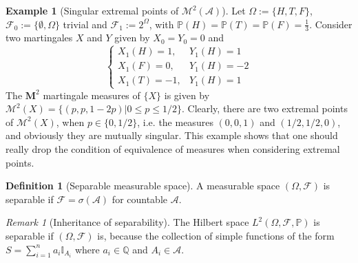 \documentclass[openany,oneside]{book}
\theoremstyle{definition}
\newtheorem{defn}[thm]{Definition}
\newtheorem{eg}[thm]{Example}
\theoremstyle{remark}
\newtheorem{rem}[thm]{Remark}
\renewcommand{\P}{\mathbb{P}} %
\newcommand{\I}{\mathbb{I}} %
\begin{document}


\begin{eg}[Singular extremal points of $\mathcal{M}^2(\mathcal{A})$]
Let $\Omega:=\{H,T,F\}$, $\mathcal{F}_0:=\{\emptyset,\Omega\}$ trivial and $\mathcal{F}_1:=2^\Omega$, with $\P(H)=\P(T)=\P(F)=\frac{1}{3}$. Consider two martingales $X$ and $Y$ given by $X_0=Y_0=0$ and
$$\begin{cases}
X_1(H) = 1, & Y_1(H) = 1 \\
X_1(F) = 0, & Y_1(H) = -2 \\
X_1(T) = -1, & Y_1(H) = 1
\end{cases}$$
The $\mathbf{M}^2$ martingale measures of $\{X\}$ is given by $\mathcal{M}^2(X)=\{(p,p,1-2p) \big\vert 0\le p \le 1/2\}$. Clearly, there are two extremal points of $\mathcal{M}^2(X)$, when $p\in\{0,1/2\}$, i.e. the measures $(0,0,1)$ and $(1/2,1/2,0)$, and obviously they are mutually singular. This example shows that one should really drop the condition of equivalence of measures when considering extremal points.
\end{eg}


\begin{defn}[Separable measurable space]
A measurable space $(\Omega,\mathcal{F})$ is separable if $\mathcal{F}=\sigma(\mathcal{A})$ for countable $\mathcal{A}$.
\end{defn}
\begin{rem}[Inheritance of separability]
The Hilbert space $L^2(\Omega,\mathcal{F},\P)$ is separable if $(\Omega,\mathcal{F})$ is, because the collection of simple functions of the form $S=\sum_{i=1}^n a_i \I_{A_i}$ where $a_i\in\mathbb{Q}$ and $A_i\in\mathcal{A}$.
\end{rem}
\end{document}
